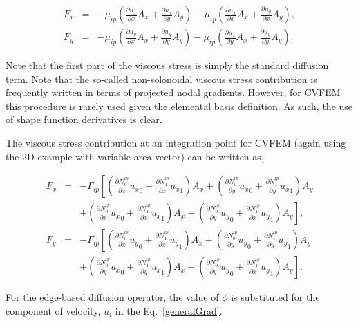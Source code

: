 \begin{eqnarray}
F_x &=& - \mu_{ip} \left( \frac{\partial u_x}{ \partial x}A_x + \frac{\partial u_x}{\partial y}A_y \right ) 
- \mu_{ip} \left( \frac{\partial u_x}{ \partial x}A_x + \frac{\partial u_y}{ \partial x}A_y \right), \\
F_y &=& - \mu_{ip} \left( \frac{\partial u_y}{ \partial x}A_x + \frac{\partial u_y}{\partial y}A_y \right ) 
- \mu_{ip} \left( \frac{\partial u_x}{ \partial y}A_x + \frac{\partial u_y}{ \partial y}A_y \right).
\end{eqnarray}

Note that the first part of the viscous stress is simply the 
standard diffusion term. Note that the so-called non-solonoidal 
viscous stress contribution is frequently written in terms of projected
nodal gradients. However, for CVFEM this procedure is rarely used 
given the elemental basis definition. As such, the use of
shape function derivatives is clear.

The viscous stress contribution at an integration point for CVFEM (again using the 2D example
with variable area vector) can be written as,

\begin{eqnarray}
  F_x &=& - \Gamma_{ip} \left[ \left(\frac{\partial N^{ip}_0} {\partial x} {u_x}_0 + \frac{\partial N^{ip}_1} {\partial x} {u_x}_1 \right) A_x + \left(\frac{\partial N^{ip}_0} {\partial y} {u_x}_0 + \frac{\partial N^{ip}_1} {\partial y} {u_x}_1 \right) A_y \right. \nonumber \\ &&
  + \left. \left(\frac{\partial N^{ip}_0} {\partial x} {u_x}_0 + \frac{\partial N^{ip}_1} {\partial x} {u_x}_1 \right) A_x + \left(\frac{\partial N^{ip}_0} {\partial y} {u_y}_0 + \frac{\partial N^{ip}_1} {\partial x} {u_y}_1 \right) A_y \right], \\ 
  F_y &=& - \Gamma_{ip} \left[ \left(\frac{\partial N^{ip}_0} {\partial x} {u_y}_0 + \frac{\partial N^{ip}_1} {\partial x} {u_y}_1 \right) A_x + \left(\frac{\partial N^{ip}_0} {\partial y} {u_y}_0 + \frac{\partial N^{ip}_1} {\partial y} {u_y}_1 \right) A_y \right. \nonumber \\ &&
  + \left. \left(\frac{\partial N^{ip}_0} {\partial y} {u_x}_0 + \frac{\partial N^{ip}_1} {\partial y} {u_x}_1 \right) A_x + \left(\frac{\partial N^{ip}_0} {\partial y} {u_y}_0 + \frac{\partial N^{ip}_1} {\partial x} {u_y}_1 \right) A_y \right].
\end{eqnarray}

For the edge-based diffusion operator, the value of
$\phi$ is substituted for the component of velocity,
$u_i$ in the Eq.~\ref{generalGrad}.

